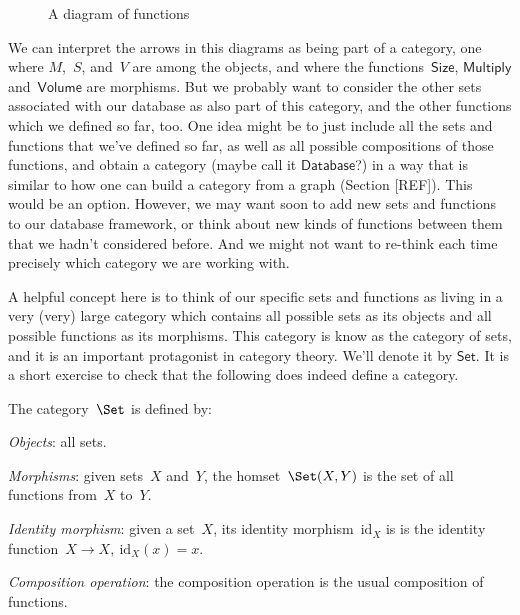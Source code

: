 \begin{figure}[h!]
\begin{center}
\end{center}
\caption{A diagram of functions \label{fig:diagram_functions}}
\end{figure}

We can interpret the arrows in this diagrams as being part of a category, one where $M$,~$S$, and~$V$ are among the objects, and where the functions~$\mathsf{Size}$, $\mathsf{Multiply}$ and~$\mathsf{Volume}$ are morphisms. But we probably want to consider the other sets associated with our database as also part of this category, and the other functions which we defined so far, too. One idea might be to just include all the sets and functions that we've defined so far, as well as all possible compositions of those functions, and obtain a category (maybe call it $\mathsf{Database}$?) in a way that is similar to how one can build a category from a graph (Section [REF]). This would be an option. However, we may want soon to add new sets and functions to our database framework, or think about new kinds of functions between them that we hadn't considered before. And we might not want to re-think each time precisely which category we are working with.

A helpful concept here is to think of our specific sets and functions as living in a very (very) large category which contains all possible sets as its objects and all possible functions as its morphisms. This category is know as the category of sets, and it is an important protagonist in category theory. We'll denote it by $\mathsf{Set}$. It is a short exercise to check that the following does indeed define a category. 

\begin{shaded}
\begin{definition}
The category~$\Set$ is defined by:
    \begin{compactenum}
    \item \emph{Objects}: all sets.
    \item \emph{Morphisms}: given sets~$X$ and~$Y$, the homset~$\Set(X,Y)$ is the set of all functions from~$X$ to~$Y$.
    \item \emph{Identity morphism}: given a set~$X$, its identity morphism~$\text{id}_X$ is
    is the identity function~$X \to X, \ \text{id}_X(x) = x$.
    \item \emph{Composition operation}: the composition operation is the usual composition of functions.
    \end{compactenum}
\end{definition}
\end{shaded}

